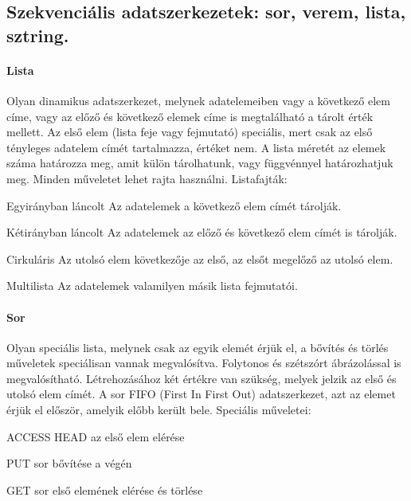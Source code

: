 \subsection{Szekvenciális adatszerkezetek: sor, verem, lista, sztring.}
\paragraph{Lista}
Olyan dinamikus adatszerkezet, melynek adatelemeiben vagy a következő elem címe, vagy az előző és következő elemek címe is megtalálható a tárolt érték mellett. Az első elem (lista feje vagy fejmutató) speciális, mert csak az első tényleges adatelem címét tartalmazza, értéket nem. A lista méretét az elemek száma határozza meg, amit külön tárolhatunk, vagy függvénnyel határozhatjuk meg. Minden műveletet lehet rajta használni. Listafajták:
\begin{enumdescript}[nosep]
	\item[Egyirányban láncolt]  Az adatelemek a következő elem címét tárolják.
	\item[Kétirányban láncolt]  Az adatelemek az előző és következő elem címét is tárolják.
	\item[Cirkuláris]  Az utolsó elem következője az első, az elsőt megelőző az utolsó elem.
	\item[Multilista]  Az adatelemek valamilyen másik lista fejmutatói.
\end{enumdescript}

\paragraph{Sor}
Olyan speciális lista, melynek csak az egyik elemét érjük el, a bővítés és törlés műveletek speciálisan vannak megvalósítva. Folytonos és szétszórt ábrázolással is megvalósítható. Létrehozásához két értékre van szükség, melyek jelzik az első és utolsó elem címét. A sor FIFO (First In First Out) adatszerkezet, azt az elemet érjük el először, amelyik előbb került bele. Speciális műveletei:
\begin{enumdescript}[nosep]
	\item[ACCESS HEAD]  az első elem elérése
	\item[PUT]  sor bővítése a végén
	\item[GET]  sor első elemének elérése és törlése
\end{enumdescript}

